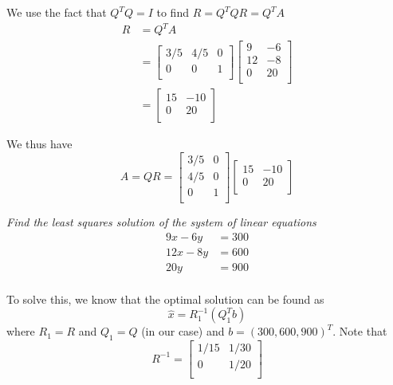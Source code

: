 We use the fact that $Q^T Q = I$ to find $R = Q^T Q R = Q^T A$
\begin{align*}
    R &= Q^T A \\
        &= \begin{bmatrix}
            3/5 & 4/5 & 0 \\
            0 & 0 & 1 \\
        \end{bmatrix}
        \begin{bmatrix}
            9 & -6 \\ 12 & -8 \\ 0 & 20 \\
        \end{bmatrix} \\
        &= \begin{bmatrix}
            15 & -10 \\
            0 & 20 \\
        \end{bmatrix}
\end{align*}

We thus have
\begin{equation*}
    A = QR = \begin{bmatrix}
        3/5 & 0 \\
        4/5 & 0 \\
        0 & 1 \\
    \end{bmatrix}
    \begin{bmatrix}
            15 & -10 \\
            0 & 20 \\
        \end{bmatrix}
\end{equation*}

\textit{Find the least squares solution of the system of linear equations}
\begin{align*}
    9x -6y &= 300 \\
    12x - 8y &= 600 \\
    20y &= 900 \\
\end{align*}


To solve this, we know that the optimal solution can be found as 
\begin{equation*}
    \hat{x} = R_1^{-1} (Q_1^T b)
\end{equation*}
where $R_1 = R$ and $Q_1 = Q$ (in our case) and $b = (300, 600, 900)^T$. Note that
\begin{equation*}
    R^{-1} = \begin{bmatrix}
            1/15 & 1/30 \\ 0 & 1/20 \\
    \end{bmatrix}
\end{equation*}

